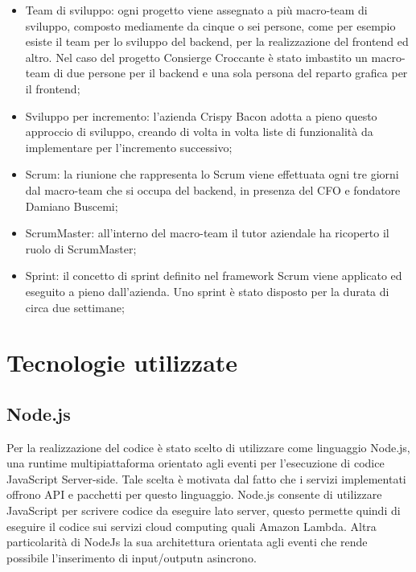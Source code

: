 \begin{itemize}
    \item Team di sviluppo: ogni progetto viene assegnato a più macro-team di sviluppo, composto mediamente da cinque o sei persone, come per esempio esiste il team per lo sviluppo del backend, per la realizzazione del frontend ed altro. Nel caso del progetto Consierge Croccante è stato imbastito un macro-team di due persone per il backend e una sola persona del reparto grafica per il frontend;
    
    \item Sviluppo per incremento: l’azienda Crispy Bacon adotta a pieno questo approccio di sviluppo, creando di volta in volta liste di funzionalità da implementare per l'incremento successivo;
    
    \item Scrum: la riunione che rappresenta lo Scrum viene effettuata ogni tre giorni dal macro-team che si occupa del backend, in presenza del CFO e fondatore Damiano Buscemi;
    
    \item ScrumMaster: all'interno del macro-team il tutor aziendale ha ricoperto il ruolo di ScrumMaster;
    
    \item Sprint: il concetto di sprint definito nel framework Scrum viene applicato ed eseguito a pieno dall'azienda. Uno sprint è stato disposto per la durata di circa due settimane;
    
\end{itemize}

\section{Tecnologie utilizzate}
\subsection{Node.js}
Per la realizzazione del codice è stato scelto di utilizzare come linguaggio Node.js, una runtime multipiattaforma orientato agli eventi per l'esecuzione di codice JavaScript Server-side. Tale scelta è motivata dal fatto che i servizi implementati offrono API e pacchetti per questo linguaggio. Node.js consente di utilizzare JavaScript per scrivere codice da eseguire lato server, questo permette quindi di eseguire il codice sui servizi cloud computing quali Amazon Lambda. Altra particolarità di NodeJs la sua architettura orientata agli eventi che rende possibile l’inserimento di input/outputn asincrono. 

